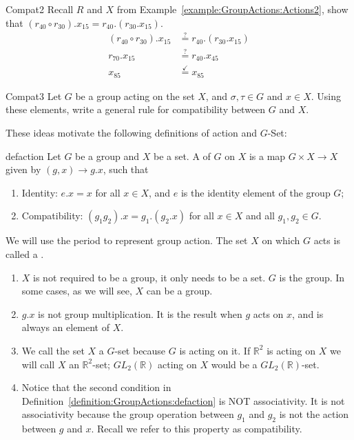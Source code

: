 \begin{example}{Compat2} Recall $R$ and $X$ from Example~\ref{example:GroupActions:Actions2}, show that $(r_{40} \circ r_{30}).x_{15}=r_{40}.(r_{30}.x_{15})$.
\begin{equation*}
\begin{split}
(r_{40} \circ r_{30}).x_{15}&\stackrel{?}{=}r_{40}.(r_{30}.x_{15}) \\
 r_{70}.x_{15}&\stackrel{?}{=}r_{40}.x_{45}\\
x_{85}&\stackrel{\checkmark}{=}x_{85}
\end{split}
\end{equation*}
\end {example}

\begin{exercise}{Compat3} Let $G$ be a group acting on the set $X$, and $\sigma, \tau \in G$ and $x \in X$. Using these elements, write a general rule for compatibility between $G$ and $X$.
\end{exercise}

These ideas motivate the following definitions of action and $G$-Set:

\begin{defn}{defaction}
Let $G$ be a group and $X$ be a set. A  of $G$ on $X$ is a map $G\times X\rightarrow X$ given by $(g, x)\rightarrow g.x$, such that
\begin{enumerate}[(1)]
\item Identity: $e.x = x$ for all $x\in X$, and $e$ is the identity element of the group $G$;
\item Compatibility: $(g_1g_2).x = g_1.(g_2.x)$ for all $x\in X$ and all $g_1, g_2 \in G$.
\end{enumerate}
We will use the period to represent group action. The set $X$ on which $G$ acts is called a  .
\end{defn}

\begin{rem}
\begin{enumerate}[(1)]
\item $X$ is not required to be a group, it only needs to be a set. $G$ is the group. In some cases, as we will see, $X$ can be a group.
\item $g.x$ is not group multiplication. It is the result when $g$ acts on $x$, and is always an element of $X$.
\item We call the set $X$ a $G$-set because $G$ is acting on it. If $\mathbb{R}^2$ is acting on $X$ we will call $X$ an $\mathbb{R}^2$-set; $GL_2 (\mathbb{R})$ acting on $X$ would be a $GL_2 (\mathbb{R})$-set.
\item Notice that the second condition in Definition~\ref{definition:GroupActions:defaction} is NOT associativity. It is not associativity because the group operation between $g_1$ and $g_2$ is not the action between $g$ and $x$. Recall we refer to this property as compatibility.
\end{enumerate}
\end{rem}

